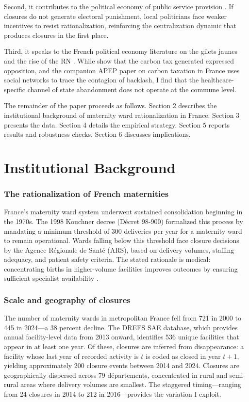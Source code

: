\documentclass[12pt]{article}
\begin{document}
Second, it contributes to the political economy of public service provision \citep{besley2006political}. If closures do not generate electoral punishment, local politicians face weaker incentives to resist rationalization, reinforcing the centralization dynamic that produces closures in the first place.

Third, it speaks to the French political economy literature on the gilets jaunes and the rise of the RN \citep{algan2019gilets}. While \citet{douenne2022yellow} show that the carbon tax generated expressed opposition, and the companion APEP paper on carbon taxation in France uses social networks to trace the contagion of backlash, I find that the healthcare-specific channel of state abandonment does not operate at the commune level.

The remainder of the paper proceeds as follows. Section 2 describes the institutional background of maternity ward rationalization in France. Section 3 presents the data. Section 4 details the empirical strategy. Section 5 reports results and robustness checks. Section 6 discusses implications.


\section{Institutional Background}

\subsubsection*{The rationalization of French maternities} France's maternity ward system underwent sustained consolidation beginning in the 1970s. The 1998 Kouchner decree (D\'{e}cret 98-900) formalized this process by mandating a minimum threshold of 300 deliveries per year for a maternity ward to remain operational. Wards falling below this threshold face closure decisions by the Agence R\'{e}gionale de Sant\'{e} (ARS), based on delivery volumes, staffing adequacy, and patient safety criteria. The stated rationale is medical: concentrating births in higher-volume facilities improves outcomes by ensuring sufficient specialist availability \citep{blondel2006trends}.

\subsubsection*{Scale and geography of closures} The number of maternity wards in metropolitan France fell from 721 in 2000 to 445 in 2024---a 38 percent decline. The DREES SAE database, which provides annual facility-level data from 2013 onward, identifies 536 unique facilities that appear in at least one year. Of these, closures are inferred from disappearance: a facility whose last year of recorded activity is $t$ is coded as closed in year $t+1$, yielding approximately 200 closure events between 2014 and 2024. Closures are geographically dispersed across 79 d\'{e}partements, concentrated in rural and semi-rural areas where delivery volumes are smallest. The staggered timing---ranging from 24 closures in 2014 to 212 in 2016---provides the variation I exploit.
\end{document}
